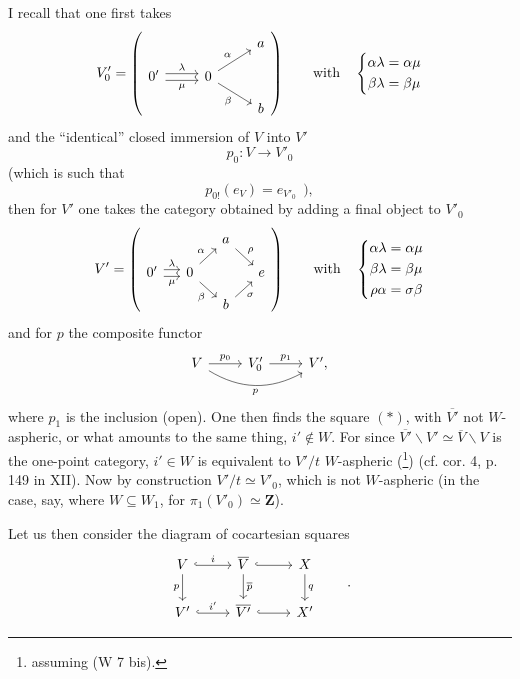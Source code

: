 I recall that one first takes
\[
V'_0 = \left(
\begin{tikzcd}[row sep=small]
 & & a \\
0' \arrow[r, shift left, "\lambda"] \arrow[r, shift right, "\mu"'] & 0 \arrow[ur, "\alpha"] \arrow[dr, "\beta"'] & \\
 & & b
\end{tikzcd}
\right)
\qquad \text{with} \quad
\left\{
\begin{aligned}
\alpha\lambda &= \alpha\mu \\
\beta\lambda &= \beta\mu
\end{aligned}
\right.
\]
and the ``identical'' closed immersion of $V$ into $V'$ 
\[ p_0 : V \longrightarrow V'_0 \]
(which is such that
\[ p_{0!}(e_V) = e_{V'_0} \ \ ), \]
then for $V'$ one takes the category obtained by adding a final object to $V'_0$
\[
V' = \left(
\begin{tikzcd}[row sep=small, column sep=small]
 & & a \arrow[dr, "\rho"] & \\
0' \arrow[r, shift left, "\lambda"] \arrow[r, shift right, "\mu"'] & 0 \arrow[ur, "\alpha"] \arrow[dr, "\beta"'] & & e \\
 & & b \arrow[ur, "\sigma"'] &
\end{tikzcd}
\right)
\qquad \text{with} \quad
\left\{
\begin{aligned}
\alpha\lambda &= \alpha\mu \\
\beta\lambda &= \beta\mu \\
\rho\alpha &= \sigma\beta
\end{aligned}
\right.
\]
and for $p$ the composite functor
\[
\begin{tikzcd}
V \arrow[r, "p_0"] \arrow[rr, bend right, "p"'] & V'_0 \arrow[r, "p_1"] & V',
\end{tikzcd}
\]
where $p_1$ is the inclusion (open). One then finds the square $(*)$, with $\overline{V'}$ not $W$-aspheric, or what amounts to the same thing, $i' \notin W$. For since $\overline{V'}\backslash V' \simeq \overline{V}\backslash V$ is the one-point category, $i' \in W$ is equivalent to $V'/t$ $W$-aspheric (\footnote[8]{assuming (W 7 bis).}) (cf. cor. 4, p. 149 in XII). Now by construction $V'/t \simeq V'_0$, which is not $W$-aspheric (in the case, say, where $W \subseteq W_1$, for $\pi_1(V'_0) \simeq \mathbf{Z}$).

Let us then consider the diagram of cocartesian squares
\[
\begin{tikzcd}
V \arrow[r, hook, "i"] \arrow[d, "p"'] & \overline{V} \arrow[r, hook] \arrow[d, "\overline{p}"] & X \arrow[d, "q"] \\
V' \arrow[r, hook, "i'"] & \overline{V'} \arrow[r, hook] & X'
\end{tikzcd}
\qquad .
\]

